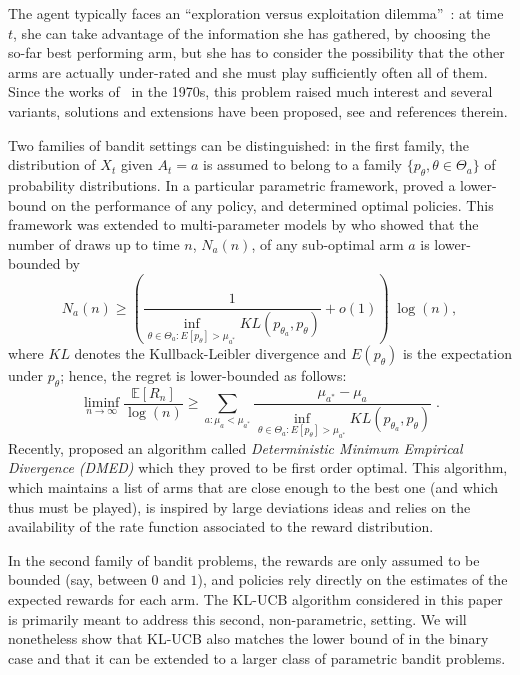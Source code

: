 \documentclass[wcp]{jmlr}
\newcommand{\E}{\mathbb{E}}
\newcommand{\1}{\mathbbm{1}}
\begin{document}
The agent typically faces an ``exploration versus exploitation dilemma''~: at
time $t$, she can take advantage of the information she has gathered, by
choosing the so-far best performing arm, but she has to consider the
possibility that the other arms are actually under-rated and she must play
sufficiently often all of them.  Since the works of~\cite{Gittins79bandits} in
the 1970s, this problem raised much interest and several variants, solutions
and extensions have been proposed, see \cite{EvendarMannorMansour02PACbandits} and references therein.

Two families of bandit settings can be distinguished: in the first family, the
distribution of $X_t$ given $A_t=a$ is assumed to belong to a family
$\{p_\theta, \theta \in \Theta_a\}$ of probability distributions.  In a
particular parametric framework, \cite{LaiRobbins85bandits} proved a
lower-bound on the performance of any policy, and determined optimal policies.
This framework was extended to multi-parameter models
by \cite{BurnetasKatehakis97bandits}  who showed that the number
of draws up to time $n$, $N_a(n)$, of any sub-optimal arm $a$ is lower-bounded by
\begin{equation}\label{eq:binfNb}
  N_a(n) \geq \left( \frac{1}{\inf_{\theta \in \Theta_a : E[p_\theta]>\mu_{a^*} } KL\left( p_{\theta_a}, p_{\theta}\right)} +o(1)\right)\;\log(n),
\end{equation}
where $KL$ denotes the Kullback-Leibler divergence and $E(p_\theta)$ is
the expectation under $p_\theta$; hence, the regret is lower-bounded as
follows:
\begin{equation}\label{eq:binfRegret}\liminf_{n\to\infty}
  \frac{\E[R_n]}{\log(n)} \geq \sum_{a:\mu_a<\mu_{a^*}} 
  \frac{\mu_{a^*}-\mu_a}{\inf_{\theta \in \Theta_a : E[p_\theta]>\mu_{a^*} }KL\left( p_{\theta_a}, p_{\theta}\right)}\;.
\end{equation}
Recently, \cite{HondaTakemura10DMED} proposed an algorithm called
\emph{Deterministic Minimum Empirical Divergence (DMED)} which they proved to be first order
optimal. This algorithm, which maintains a list of arms that are close enough
to the best one (and which thus must be played), is inspired by large
deviations ideas and relies on the availability of the rate function associated to the reward distribution.

In the second family of bandit problems, the rewards are only
assumed to be bounded (say, between $0$ and $1$), and policies rely directly on
the estimates of the expected rewards for each arm. The KL-UCB algorithm considered in this paper is primarily meant to address this second, non-parametric, setting.
We will nonetheless show that KL-UCB also matches the lower bound of \cite{BurnetasKatehakis97bandits} in the binary case and that it can be extended to a larger class of parametric bandit problems.
\end{document}

